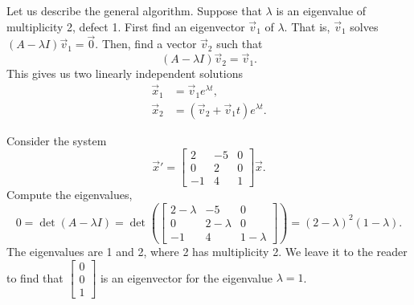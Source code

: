 Let us describe the general algorithm.  Suppose that $\lambda$ is an
eigenvalue of multiplicity 2, defect 1.
First find an eigenvector $\vec{v}_1$ of $\lambda$.  
That is, $\vec{v}_1$ solves
$(A-\lambda I)\vec{v}_1  = \vec{0}$.
Then, find a vector $\vec{v}_2$ such that
\begin{equation*}
(A-\lambda I)\vec{v}_2 = \vec{v}_1 .
\end{equation*}
This gives us two linearly independent solutions
\begin{align*}
\vec{x}_1 & = \vec{v}_1 e^{\lambda t} , \\
\vec{x}_2 & = \left( \vec{v}_2 + \vec{v}_1 t \right) e^{\lambda t} .
\end{align*}

\begin{example}
Consider the system
\begin{equation*}
\vec{x}' =
\begin{bmatrix}
2 & -5 & 0 \\
0 & 2 & 0 \\
-1 & 4 & 1
\end{bmatrix}
\vec{x} .
\end{equation*}
Compute the eigenvalues,
\begin{equation*}
0 =
\det(A-\lambda I) = 
\det\left(
\begin{bmatrix}
2-\lambda & -5 & 0 \\
0 & 2-\lambda & 0 \\
-1 & 4 & 1-\lambda
\end{bmatrix}
\right)
= (2-\lambda)^2(1-\lambda) .
\end{equation*}
The eigenvalues are 1 and 2, where 2 has multiplicity 2.
We leave it to the reader to find that
$\left[ \begin{smallmatrix} 0 \\ 0 \\ 1 \end{smallmatrix} \right]$
is an eigenvector
for the eigenvalue $\lambda = 1$.


\end{example}
